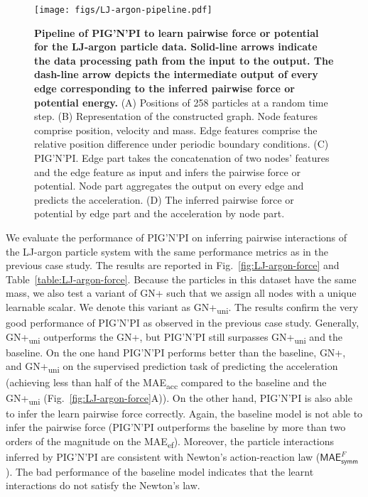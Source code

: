 \documentclass{article}
\newcommand{\pignpi}{PIG'N'PI\xspace}
\newcommand{\lemos}{GN+\xspace}
\begin{document}
\begin{figure}[h!]
    \centering
    \texttt{[image: figs/LJ-argon-pipeline.pdf]}
    \caption{\textbf{Pipeline of \pignpi to learn pairwise force or potential for the LJ-argon particle data. Solid-line arrows indicate the data processing path from the input to the output. The dash-line arrow depicts the intermediate output of every edge corresponding to the inferred pairwise force or potential energy.} (A) Positions of 258 particles at a random time step. (B) Representation of the constructed graph. Node features comprise position, velocity and mass. Edge features comprise the relative position difference under periodic boundary conditions. (C) \pignpi. Edge part takes the concatenation of two nodes' features and the edge feature as input and infers the pairwise force or potential. Node part aggregates the output on every edge and predicts the acceleration. (D) The inferred pairwise force or potential by edge part and the acceleration by node part.}
    \label{fig:LJ-argon-pipeline}
\end{figure}

We evaluate the performance of \pignpi on inferring pairwise interactions of the LJ-argon particle system with the same performance metrics as in the previous case study. The results are reported in Fig.~\ref{fig:LJ-argon-force} and Table~\ref{table:LJ-argon-force}. {Because the particles in this dataset have the same mass, we also test a variant of \lemos such that we assign all nodes with a unique learnable scalar. We denote this variant as GN+\textsubscript{uni}.} The results confirm the very good performance of \pignpi as observed in the previous case study. {Generally, GN+\textsubscript{uni} outperforms the \lemos, but \pignpi still surpasses GN+\textsubscript{uni} and the baseline.}  On the one hand \pignpi performs better than the baseline{, \lemos, and GN+\textsubscript{uni}} on the supervised prediction task of predicting the acceleration (achieving less than half of the \textsf{MAE\textsubscript{acc}} compared to the baseline {and the GN+\textsubscript{uni}} (Fig.~\ref{fig:LJ-argon-force}A)). On the other hand, \pignpi is also able to infer the learn pairwise force correctly. Again, the baseline model is not able to infer the pairwise force (\pignpi outperforms the baseline by more than two orders of the magnitude on the \textsf{MAE\textsubscript{ef}}).      Moreover, the  particle interactions inferred by \pignpi are consistent with Newton’s action-reaction law ($\textsf{MAE}_\textsf{symm}^{F}$). The bad performance of the baseline model indicates that the learnt interactions do not satisfy the Newton's law.  
\end{document}
